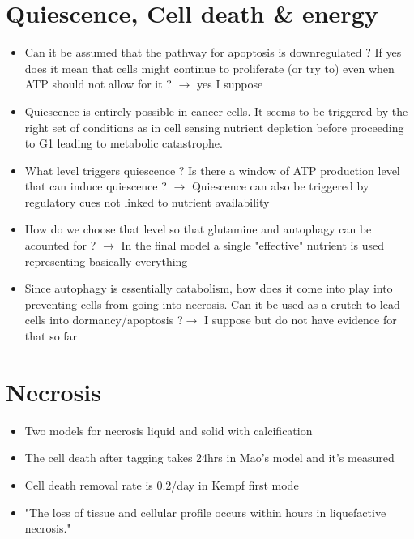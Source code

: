 \documentclass[11pt,a4paper]{article}
\begin{document}
\section{Quiescence, Cell death \& energy}
\begin{itemize}
\item Can it be assumed that the pathway for apoptosis is downregulated ? If yes does it mean that cells might continue to proliferate (or try to) even when ATP should not allow for it ? $\rightarrow$ yes I suppose
\item Quiescence is entirely possible in cancer cells. It seems to be triggered by the right set of conditions as in cell sensing nutrient depletion before proceeding to G1 leading to metabolic catastrophe.
\item What level triggers quiescence ? Is there a window of ATP production level that can induce quiescence ? $\rightarrow$ Quiescence can also be triggered by regulatory cues not linked to nutrient availability
\item How do we choose that level so that glutamine and autophagy can be acounted for ? $\rightarrow$ In the final model a single "effective" nutrient is used representing basically everything
\item Since autophagy is essentially catabolism, how does it come into play into preventing cells from going into necrosis. Can it be used as a crutch to lead cells into dormancy/apoptosis ?$\rightarrow$ I suppose but do not have evidence for that so far

\end{itemize}

\section{Necrosis}
\begin{itemize}
\item Two models for necrosis liquid and solid with calcification \cite{Thim2010}\cite{YuMi2017}
\item The cell death after tagging takes 24hrs in Mao's model and it's measured \cite{Mao2018}
\item Cell death removal rate is 0.2/day in Kempf first mode \cite{Kempf2005}
\item "The loss of tissue and cellular profile occurs within hours in liquefactive necrosis." \cite{Adigun2024}
\end{itemize} 
\end{document}
